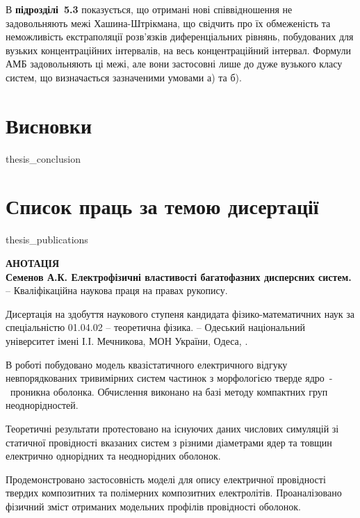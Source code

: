 \documentclass[twoside,a4paper,14pt]{vakaref}
\begin{document}
В {\bf підрозділі~5.3} показується, що отримані нові співвідношення не задовольняють межі Хашина-Штрікмана, що свідчить про їх обмеженість та неможливість  екстраполяції розв'язків диференціальних рівнянь, побудованих для вузьких концентраційних інтервалів, на весь концентраційний інтервал. Формули АМБ задовольняють ці межі, але вони застосовні лише до дуже вузького класу систем, що визначається зазначеними умовами а) та б).


\part{Висновки}
\vspace{-6.5pt}

{thesis_conclusion}

\part{Список праць за темою дисертації}

{thesis_publications}

\vspace{-7pt}



\bigskip

\begin{center}
	{\normalfont \textbf{
			АНОТАЦІЯ\\
			Семенов А.К. Електрофізичні властивості багатофазних дисперсних систем.} -- Кваліфікаційна наукова праця на правах рукопису.}
\end{center}
\vskip 5pt

Дисертація на здобуття наукового ступеня кандидата фізико-матема\-тичних наук за спеціальністю 01.04.02 -- теоретична фізика. -- Одеський національний університет імені І.І. Мечникова, МОН України, Одеса, \the\year.

\vskip 5pt

В роботі побудовано модель квазістатичного електричного відгуку невпорядкованих тривимірних систем частинок з морфологією тверде ядро~-~проникна оболонка. Обчислення виконано на базі методу компактних груп неоднорідностей.

Теоретичні результати протестовано на існуючих даних числових симуляцій зі статичної провідності вказаних систем з різними діаметрами ядер та товщин електрично однорідних та неоднорідних оболонок. 

Продемонстровано застосовність моделі для опису електричної провідності твердих композитних та полімерних композитних електролітів. Проаналізовано фізичний зміст отриманих модельних профілів провідності оболонок. 
\end{document}
